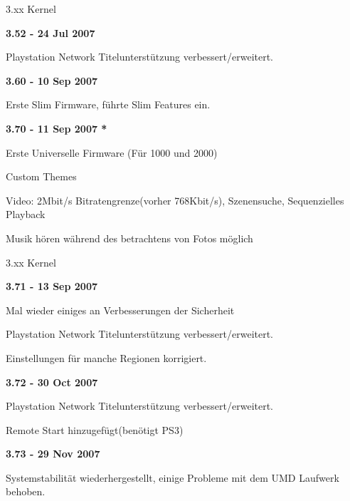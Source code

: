 \documentclass[mode=print,paper=screen,style=jefka]{powerdot}
\newcommand{\Anf}[1]{\glqq #1\grqq}
\begin{document}
\begin{slide}{3.xx Kernel}
	\begin{large}\textbf{3.52 - 24 Jul 2007}\end{large}
	\begin{list}{-}{}
		\item{Playstation Network Titelunterstützung verbessert/erweitert.}
	\end{list}
	\begin{large}\textbf{3.60 - 10 Sep 2007}\end{large}
	\begin{list}{-}{}
		\item{Erste Slim Firmware, führte Slim Features ein.}
	\end{list}
	\begin{large}\textbf{3.70 - 11 Sep 2007 *}\end{large}
	\begin{list}{-}{}
		\item{Erste Universelle Firmware (Für 1000 und 2000)}
		\item{Custom Themes}
		\item{Video: 2Mbit/s Bitratengrenze(vorher 768Kbit/s), Szenensuche, Sequenzielles Playback}
		\item{Musik hören während des betrachtens von Fotos möglich} 
	\end{list}
\end{slide}

\begin{slide}{3.xx Kernel}
	\begin{large}\textbf{3.71 - 13 Sep 2007}\end{large}
	\begin{list}{-}{}
		\item{Mal wieder einiges an Verbesserungen der \Anf{Sicherheit}}
		\item{Playstation Network Titelunterstützung verbessert/erweitert.}
		\item{Einstellungen für manche Regionen korrigiert.}
	\end{list}
	\begin{large}\textbf{3.72 - 30 Oct 2007}\end{large}
	\begin{list}{-}{}
		\item{Playstation Network Titelunterstützung verbessert/erweitert.}
		\item{Remote Start hinzugefügt(benötigt PS3)}
	\end{list}
	\begin{large}\textbf{3.73 - 29 Nov 2007}\end{large}
	\begin{list}{-}{}
		\item{Systemstabilität wiederhergestellt, einige Probleme mit dem UMD Laufwerk behoben.}
	\end{list}
\end{slide}
\end{document}
